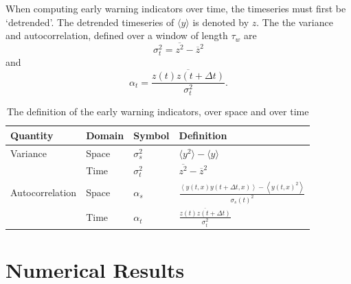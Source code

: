 When computing early warning indicators over time, the timeseries must first be `detrended'. The detrended timeseries of $\langle y \rangle$ is denoted by $z$.
The the variance and autocorrelation, defined over a window of length $\tau_w$ are
\begin{equation}
  \label{eq:temporal_variance}
  \sigma_t^2 = \overline{z^2} - \overline{z}^2 
\end{equation}
and
\begin{equation}
  \label{eq:temporal_autocorrelation}
  \alpha_t = \frac{\overline{z(t)z(t+\Delta t)}}{\sigma_t^2}.
\end{equation}
\begin{table}
  \centering
  \begin{tabular}{llll}
    \toprule
    Quantity        & Domain & Symbol        & Definition \\
    \midrule
    Variance        & Space  & $\sigma_s^2$  & $\langle y^2 \rangle - \langle y \rangle$ \\
    \rule{0pt}{4ex}    
                    & Time   & $\sigma_t^2$  & $\overline{z^2} - \overline{z}^2$ \\
    \rule{0pt}{4ex}    
    Autocorrelation & Space  & $\alpha_s$    & $\frac{\left\langle y\left(t,x\right)y\left(t+\Delta t,x\right)\right\rangle - \left\langle y\left(t,x\right)^2 \right\rangle}{\sigma_s(t)^2}$ \\
    \rule{0pt}{4ex}    
                    & Time   & $\alpha_t$    &  $\frac{\overline{z(t)z(t+\Delta t)}}{\sigma_t^2}$ \\
    \bottomrule
  \end{tabular}
  \caption[Definition of spatial and temporal early warning signals]{The definition of the early warning indicators, over space and over time}
  \label{tab:ews_space_time_definition}
\end{table}

\section{Numerical Results}
